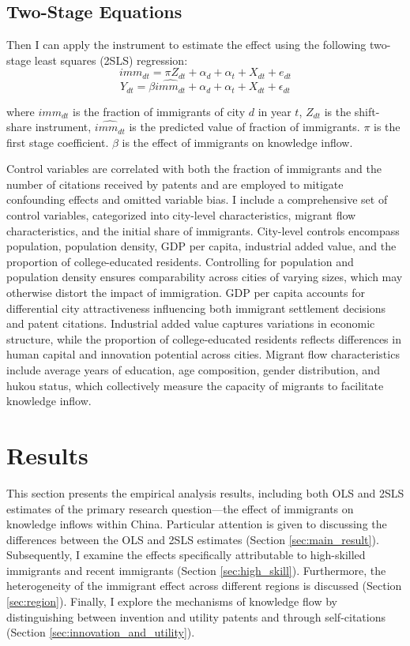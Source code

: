 \documentclass[12pt]{article}
\begin{document}
\subsection{Two-Stage Equations}\label{sec:2sls}

Then I can apply the instrument to estimate the effect using the following two-stage least squares (2SLS) regression:
\begin{equation}
 imm_{dt}=\pi Z_{dt}+\alpha_d+\alpha_t+X_{dt}+e_{dt}
\end{equation}
\begin{equation}
 Y_{dt}=\beta\widehat{imm_{dt}}+\alpha_d+\alpha_t+X_{dt}+\epsilon_{dt}
\end{equation}

where $imm_{dt}$ is the fraction of immigrants of city $d$ in year $t$, $Z_{dt}$ is the shift-share instrument, $\widehat{imm_{dt}}$ is the predicted value of fraction of immigrants. $\pi$ is the first stage coefficient. $\beta$ is the effect of immigrants on knowledge inflow. 

Control variables are correlated with both the fraction of immigrants and the number of citations received by patents and are employed to mitigate confounding effects and omitted variable bias. I include a comprehensive set of control variables, categorized into city-level characteristics, migrant flow characteristics, and the initial share of immigrants. City-level controls encompass population, population density, GDP per capita, industrial added value, and the proportion of college-educated residents. Controlling for population and population density ensures comparability across cities of varying sizes, which may otherwise distort the impact of immigration. GDP per capita accounts for differential city attractiveness influencing both immigrant settlement decisions and patent citations. Industrial added value captures variations in economic structure, while the proportion of college-educated residents reflects differences in human capital and innovation potential across cities. Migrant flow characteristics include average years of education, age composition, gender distribution, and hukou status, which collectively measure the capacity of migrants to facilitate knowledge inflow.


\section{Results} \label{sec:result}

This section presents the empirical analysis results, including both OLS and 2SLS estimates of the primary research question—the effect of immigrants on knowledge inflows within China. Particular attention is given to discussing the differences between the OLS and 2SLS estimates (Section \ref{sec:main_result}). 
Subsequently, I examine the effects specifically attributable to high-skilled immigrants and recent immigrants (Section \ref{sec:high_skill}). 
Furthermore, the heterogeneity of the immigrant effect across different regions is discussed (Section \ref{sec:region}).
Finally, I explore the mechanisms of knowledge flow by distinguishing between invention and utility patents and through self-citations (Section \ref{sec:innovation_and_utility}). 
\end{document}

